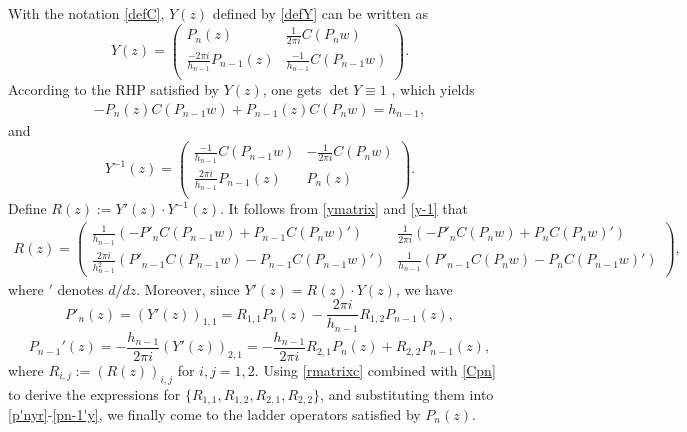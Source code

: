\documentclass[12pt,a4paper]{article}    %
\numberwithin{equation}{section}
\begin{document}
With the notation \eqref{defC}, $Y(z)$ defined by \eqref{defY} can be written as
\begin{equation}\label{ymatrix}
	Y(z) = \begin{pmatrix}
		P_n(z) & \frac{1}{2\pi i} C(P_nw) \\
		\frac{-2\pi i}{h_{n-1}} P_{n-1}(z) & \frac{-1}{h_{n-1}}C(P_{n-1}w)  \\
\end{pmatrix}.
\end{equation}
According to the RHP satisfied by $Y(z)$, one gets $\det Y \equiv 1$ \cite[Section 4.2]{WvA18}, which yields
\begin{align}\label{I1}
-P_n(z)C(P_{n-1}w)+P_{n-1}(z)C(P_nw) =h_{n-1},
\end{align}
and
\begin{equation}
	\label{y-1}
	Y^{-1}(z) = \begin{pmatrix}		 \frac{-1}{h_{n-1}}C(P_{n-1}w) & -\frac{1}{2\pi i} C(P_nw)\\
\frac{2\pi i}{h_{n-1}} P_{n-1}(z)  & P_n(z)  \\
\end{pmatrix}.	
\end{equation}
Define $R(z):=Y'(z)\cdot Y^{-1}(z)$. It follows from \eqref{ymatrix} and \eqref{y-1} that
\begin{align}\label{rmatrixc}
R(z)=\begin{pmatrix}			 \frac{1}{h_{n-1}}(-P'_nC(P_{n-1}w)+P_{n-1}C(P_nw)') & \frac{1}{2\pi i}(-P'_nC(P_nw)+P_nC(P_nw)')  \\
\frac{2\pi i}{h_{n-1}^{2}}(P'_{n-1}C(P_{n-1}w)-P_{n-1}C(P_{n-1}w)') & \frac{1}{h_{n-1}}(P'_{n-1}C(P_nw)-P_nC(P_{n-1}w)')
\end{pmatrix},
\end{align}
where $'$ denotes $d/dz$. Moreover, since $Y'(z)=R(z)\cdot Y(z)$, we have
	\begin{equation}\label{p'nyr}		 P'_n(z)=\left(Y'(z)\right)_{1,1}=R_{1,1}P_n(z)-\frac{2\pi i}{h_{n-1}}R_{1,2}P_{n-1}(z),
	\end{equation}
	\begin{equation}\label{pn-1'y}		 P_{n-1}'(z)=-\frac{h_{n-1}}{2\pi i}\left(Y'(z)\right)_{2,1}=-\frac{h_{n-1}}{2\pi i}R_{2,1}P_n(z)+R_{2,2}P_{n-1}(z),
	\end{equation}
where $R_{i,j}:=\left(R(z)\right)_{i,j}$ for $i,j=1,2$. Using \eqref{rmatrixc} combined with \eqref{Cpn} to derive the expressions for $\{R_{1,1}, R_{1,2}, R_{2,1},R_{2,2}\}$, and substituting them into \eqref{p'nyr}-\eqref{pn-1'y}, we finally come to the ladder operators satisfied by $P_n(z)$.
\end{document}
